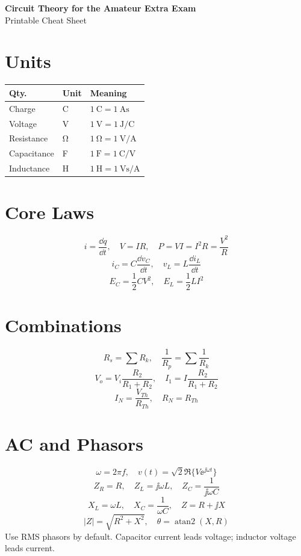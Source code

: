 \documentclass[10pt,letterpaper]{article}
\begin{document}
\begin{center}
{\Large\bfseries Circuit Theory for the Amateur Extra Exam}\\[0.2em]
{\normalsize Printable Cheat Sheet}
\end{center}

\begin{multicols}{2}
\section*{Units}
\begin{tabularx}{\columnwidth}{@{}L{0.28\columnwidth}L{0.22\columnwidth}Y@{}}
\toprule
Qty. & Unit & Meaning\\
\midrule
Charge & \si{\coulomb} & \(\SI{1}{\coulomb}=\SI{1}{\ampere\second}\)\\
Voltage & \si{\volt} & \(\SI{1}{\volt}=\SI{1}{\joule\per\coulomb}\)\\
Resistance & \si{\ohm} & \(\SI{1}{\ohm}=\SI{1}{\volt\per\ampere}\)\\
Capacitance & \si{\farad} & \(\SI{1}{\farad}=\SI{1}{\coulomb\per\volt}\)\\
Inductance & \si{\henry} & \(\SI{1}{\henry}=\SI{1}{\volt\second\per\ampere}\)\\
\bottomrule
\end{tabularx}

\section*{Core Laws}
\[
i=\frac{\dd q}{\dd t},\quad V=IR,\quad
P=VI=I^2R=\frac{V^2}{R}
\]
\[
i_C=C\frac{\dd v_C}{\dd t},\quad
v_L=L\frac{\dd i_L}{\dd t}
\]
\[
E_C=\frac{1}{2}CV^2,\quad
E_L=\frac{1}{2}LI^2
\]

\section*{Combinations}
\[
R_s=\sum R_k,\quad
\frac{1}{R_p}=\sum\frac{1}{R_k}
\]
\[
V_o=V_i\frac{R_2}{R_1+R_2},\quad
I_1=I\frac{R_2}{R_1+R_2}
\]
\[
I_N=\frac{V_{Th}}{R_{Th}},\quad R_N=R_{Th}
\]

\section*{AC and Phasors}
\[
\omega=2\pi f,\quad
v(t)=\sqrt{2}\Re\{V\ee^{\jj\omega t}\}
\]
\[
Z_R=R,\quad Z_L=\jj\omega L,\quad
Z_C=\frac{1}{\jj\omega C}
\]
\[
X_L=\omega L,\quad X_C=\frac{1}{\omega C},\quad Z=R+\jj X
\]
\[
|Z|=\sqrt{R^2+X^2},\quad \theta=\operatorname{atan2}(X,R)
\]
Use RMS phasors by default. Capacitor current leads voltage; inductor voltage
leads current.


\end{multicols}
\end{document}
